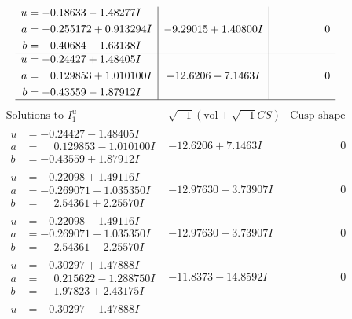 \documentclass[1p]{elsarticle_modified}
\theoremstyle{definition}
\newcommand{\I}{\sqrt{-1}}
\begin{document}
$$\begin{array}{c|c|c}
\begin{aligned}
u &= -0.18633 - 1.48277 I \\
a &= -0.255172 + 0.913294 I \\
b &= \phantom{-}0.40684 - 1.63138 I\end{aligned}
 & -9.29015 + 1.40800 I & \phantom{-0.000000 } 0 \\ \hline\begin{aligned}
u &= -0.24427 + 1.48405 I \\
a &= \phantom{-}0.129853 + 1.010100 I \\
b &= -0.43559 - 1.87912 I\end{aligned}
 & -12.6206 - 7.1463 I & \phantom{-0.000000 } 0\\
 \hline 
 \end{array}$$\newpage$$\begin{array}{c|c|c}  
\text{Solutions to }I^u_{1}& \I (\text{vol} + \sqrt{-1}CS) & \text{Cusp shape}\\
 \hline 
\begin{aligned}
u &= -0.24427 - 1.48405 I \\
a &= \phantom{-}0.129853 - 1.010100 I \\
b &= -0.43559 + 1.87912 I\end{aligned}
 & -12.6206 + 7.1463 I & \phantom{-0.000000 } 0 \\ \hline\begin{aligned}
u &= -0.22098 + 1.49116 I \\
a &= -0.269071 - 1.035350 I \\
b &= \phantom{-}2.54361 + 2.25570 I\end{aligned}
 & -12.97630 - 3.73907 I & \phantom{-0.000000 } 0 \\ \hline\begin{aligned}
u &= -0.22098 - 1.49116 I \\
a &= -0.269071 + 1.035350 I \\
b &= \phantom{-}2.54361 - 2.25570 I\end{aligned}
 & -12.97630 + 3.73907 I & \phantom{-0.000000 } 0 \\ \hline\begin{aligned}
u &= -0.30297 + 1.47888 I \\
a &= \phantom{-}0.215622 - 1.288750 I \\
b &= \phantom{-}1.97823 + 2.43175 I\end{aligned}
 & -11.8373 - 14.8592 I & \phantom{-0.000000 } 0 \\ \hline\begin{aligned}
u &= -0.30297 - 1.47888 I \\

\end{aligned}
\end{array}$$
\end{document}
